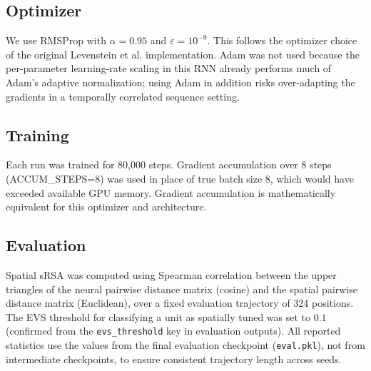 \documentclass[11pt, a4paper]{article}
\begin{document}
\subsection*{Optimizer}
We use RMSProp with $\alpha=0.95$ and $\varepsilon=10^{-9}$. This follows
the optimizer choice of the original Levenstein et al. implementation.
Adam was not used because the per-parameter learning-rate scaling in this
RNN already performs much of Adam's adaptive normalization; using Adam in
addition risks over-adapting the gradients in a temporally correlated
sequence setting.

\subsection*{Training}
Each run was trained for 80,000 steps. Gradient accumulation over 8 steps
(ACCUM\_STEPS=8) was used in place of true batch size 8, which would have
exceeded available GPU memory. Gradient accumulation is mathematically
equivalent for this optimizer and architecture.

\subsection*{Evaluation}
Spatial sRSA was computed using Spearman correlation between the upper
triangles of the neural pairwise distance matrix (cosine) and the spatial
pairwise distance matrix (Euclidean), over a fixed evaluation trajectory
of 324 positions. The EVS threshold for classifying a unit as spatially
tuned was set to $0.1$ (confirmed from the \texttt{evs\_threshold} key
in evaluation outputs). All reported statistics use the values from the
final evaluation checkpoint (\texttt{eval.pkl}), not from intermediate
checkpoints, to ensure consistent trajectory length across seeds.
\end{document}
